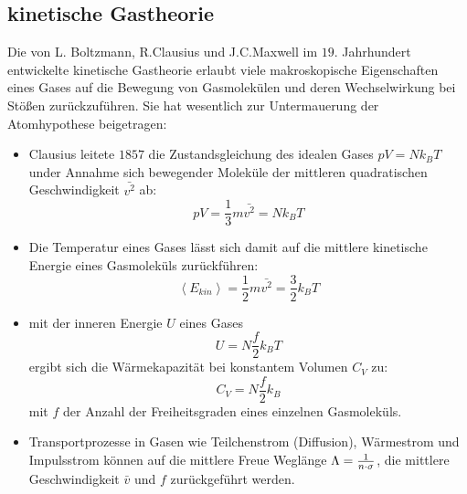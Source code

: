 \subsection{kinetische Gastheorie} %
\label{sub:kinetischer_Gastheorie}
Die von L. Boltzmann, R.Clausius und J.C.Maxwell im $19$. Jahrhundert
entwickelte kinetische Gastheorie erlaubt viele makroskopische Eigenschaften
eines Gases auf die Bewegung von Gasmolekülen und deren Wechselwirkung bei
Stößen zurückzuführen. Sie hat wesentlich zur Untermauerung der Atomhypothese
beigetragen:
\begin{itemize}
    \item Clausius leitete $1857$ die Zustandsgleichung des idealen Gases $pV=N
    k_B T$ under Annahme sich bewegender Moleküle der mittleren quadratischen
    Geschwindigkeit $\bar{v^2}$ ab: 
    \begin{equation*}
        pV = \frac{1}{3} m \bar{v^2} = N k_B T
    \end{equation*}
    \item Die Temperatur eines Gases lässt sich damit auf die mittlere
    kinetische Energie eines Gasmoleküls zurückführen:
    \begin{equation*}
        \left\langle E_{kin} \right\rangle
        =
        \frac{1}{2} m \bar{v^2} 
        =
        \frac{3}{2} k_B T
    \end{equation*}
    \item mit der inneren Energie $U$ eines Gases
    \begin{equation*}
        U = N \frac{f}{2} k_B T
    \end{equation*}
    ergibt sich die Wärmekapazität bei konstantem Volumen $C_V$ zu:
    \begin{equation*}
        C_V = N \frac{f}{2} k_B
    \end{equation*}
    mit $f$ der Anzahl der Freiheitsgraden eines einzelnen Gasmoleküls.
    \item Transportprozesse in Gasen wie Teilchenstrom (Diffusion), Wärmestrom
    und Impulsstrom können auf die mittlere Freue Weglänge $\Lambda =
    \frac{1}{n \cdot \sigma}$, die mittlere Geschwindigkeit $\bar{v}$ und $f$
    zurückgeführt werden.

\end{itemize}

